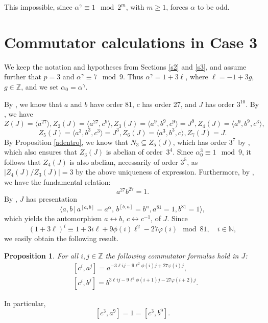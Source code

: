 \documentclass{amsart}
\newtheorem{prop}[theorem]{Proposition}
\theoremstyle{definition}
\theoremstyle{remark}
\newcommand \Z{{\mathbb Z}}
\newcommand \N{{\mathbb N}}
\begin{document}
{\medskip

 This impossible, since $\alpha^\gamma\equiv 1\mod 2^m$,
with $m\geq 1$, forces $\alpha$ to be odd.

\section{Commutator calculations in Case 3}\label{s6}

We keep the notation and hypotheses from Sections \ref{s2} and \ref{s3}, and assume further that $p=3$
and $\alpha^\gamma\equiv 7\mod 9$. Thus $\alpha^\gamma=1+3\ell$, where 
$\ell=-1+3g$, $g\in\Z$, and we set $\alpha_0=\alpha^\gamma$.

By \cite[Theorem 7.1 and Proposition 7.2]{MS}, we know that $a$ and $b$ have order 81, $c$ has order 27,
and $J$ has order $3^{10}$. By 
\cite[Theorem 8.1]{MS}, we have
$$Z(J)=\langle a^{27}\rangle, Z_2(J)=\langle a^{27},c^9\rangle, Z_3(J)=\langle a^9,b^9,c^9\rangle=J^9,
Z_4(J)=\langle a^9,b^9,c^3\rangle, 
$$
$$
Z_5(J)=\langle a^3,b^3,c^3\rangle=J^3,
Z_6(J)=\langle a^3,b^3,c\rangle, Z_7(J)=J.
$$
By Proposition \ref{adentro}, we know that $N_3\subseteq Z_5(J)$,
which has order $3^7$ by \cite[Proposition 9.3]{MS}, which also ensures that 
$Z_3(J)$ is abelian of order~$3^4$. Since $\alpha_0^3\equiv 1\mod 9$,
it follows that $Z_4(J)$ is also abelian, necessarily of
order $3^5$, as $|Z_4(J)/Z_3(J)|=3$ by the above uniqueness of expression. 
Furthermore, by \cite[Proposition 6.4]{MS}, we have the fundamental relation:
\begin{equation}
\label{futres}
a^{27}b^{27}=1.
\end{equation}
By \cite[Theorem 5.3]{MS}, $J$ has presentation
$$
\langle a,b\,|\, a^{[a,b]}=a^\alpha,\, b^{[b,a]}=b^\alpha, a^{81}=1, b^{81}=1\rangle,
$$
which yields the automorphism $a\leftrightarrow  b$, $c\leftrightarrow  c^{-1}$, of $J$.  Since
$$
(1+3\ell)^i\equiv 1+3i\ell+9\phi(i)\ell^2-27\varphi(i)\mod 81,\quad i\in\N,
$$
we easily obtain the following result.

\begin{prop}\label{prop.commutators3}
    For all $i,j\in\Z$ the following commutator formulas hold in $J$:
    \begin{align}
        &[c^i,a^j]
        = a^{-3\ell ij - 9\ell^2\phi(i)j+27\varphi(i)j},\label{eq.c31}\\
        &[c^i,b^j]
        = b^{3\ell ij - 9\ell^2\phi(i+1)j-27\varphi(i+2)j}.\label{eq.c32}
    \end{align}
    \end{prop}
In particular,
\begin{equation}
\label{cab}
[c^3,a^9]=1=[c^3,b^9].
\end{equation}


}
\end{document}
